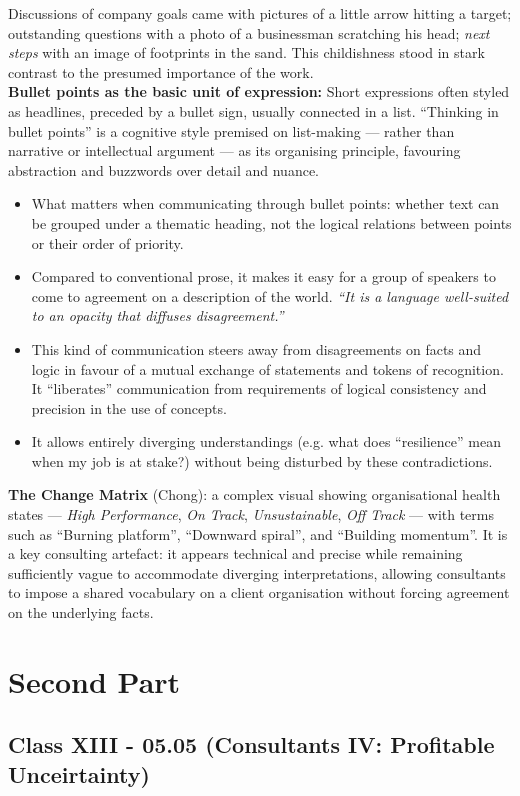 \documentclass[a4paper,12pt]{article}
\begin{document}
\noindent Discussions of company goals came with pictures of a little arrow hitting a target; outstanding questions with a photo of a businessman scratching his head; \emph{next steps} with an image of footprints in the sand. This childishness stood in stark contrast to the presumed importance of the work. \\

\noindent \textbf{Bullet points as the basic unit of expression:} Short expressions often styled as headlines, preceded by a bullet sign, usually connected in a list. ``Thinking in bullet points'' is a cognitive style premised on list-making — rather than narrative or intellectual argument — as its organising principle, favouring abstraction and buzzwords over detail and nuance.

\begin{itemize}
	\item What matters when communicating through bullet points: whether text can be grouped under a thematic heading, not the logical relations between points or their order of priority.
	\item Compared to conventional prose, it makes it easy for a group of speakers to come to agreement on a description of the world. \emph{``It is a language well-suited to an opacity that diffuses disagreement.''}
	\item This kind of communication steers away from disagreements on facts and logic in favour of a mutual exchange of statements and tokens of recognition. It ``liberates'' communication from requirements of logical consistency and precision in the use of concepts.
	\item It allows entirely diverging understandings (e.g. what does ``resilience'' mean when my job is at stake?) without being disturbed by these contradictions.
\end{itemize}

\noindent \textbf{The Change Matrix} (Chong): a complex visual showing organisational health states — \emph{High Performance}, \emph{On Track}, \emph{Unsustainable}, \emph{Off Track} — with terms such as ``Burning platform'', ``Downward spiral'', and ``Building momentum''. It is a key consulting artefact: it appears technical and precise while remaining sufficiently vague to accommodate diverging interpretations, allowing consultants to impose a shared vocabulary on a client organisation without forcing agreement on the underlying facts.

\section*{Second Part}
\subsection*{Class XIII - 05.05 (Consultants IV: Profitable Unceirtainty)}
\end{document}
